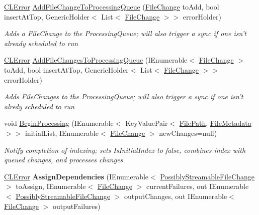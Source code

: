 \begin{DoxyCompactItemize}
\hyperlink{class_cloud_api_public_1_1_model_1_1_c_l_error}{C\-L\-Error} \hyperlink{class_cloud_api_public_1_1_file_monitor_1_1_monitor_agent_af707ac6cbc22572792f6622398843a47}{Add\-File\-Change\-To\-Processing\-Queue} (\hyperlink{class_cloud_api_public_1_1_model_1_1_file_change}{File\-Change} to\-Add, bool insert\-At\-Top, Generic\-Holder$<$ List$<$ \hyperlink{class_cloud_api_public_1_1_model_1_1_file_change}{File\-Change} $>$$>$ error\-Holder)
\begin{DoxyCompactList}\small\item\em Adds a File\-Change to the Processing\-Queue; will also trigger a sync if one isn't already scheduled to run \end{DoxyCompactList}\item 
\hyperlink{class_cloud_api_public_1_1_model_1_1_c_l_error}{C\-L\-Error} \hyperlink{class_cloud_api_public_1_1_file_monitor_1_1_monitor_agent_a6b0aae3780c7432b524a676672707ebb}{Add\-File\-Changes\-To\-Processing\-Queue} (I\-Enumerable$<$ \hyperlink{class_cloud_api_public_1_1_model_1_1_file_change}{File\-Change} $>$ to\-Add, bool insert\-At\-Top, Generic\-Holder$<$ List$<$ \hyperlink{class_cloud_api_public_1_1_model_1_1_file_change}{File\-Change} $>$$>$ error\-Holder)
\begin{DoxyCompactList}\small\item\em Adds File\-Changes to the Processing\-Queue; will also trigger a sync if one isn't alredy scheduled to run \end{DoxyCompactList}\item 
void \hyperlink{class_cloud_api_public_1_1_file_monitor_1_1_monitor_agent_af6a13b7d0c183eda555e669a90e3f122}{Begin\-Processing} (I\-Enumerable$<$ Key\-Value\-Pair$<$ \hyperlink{class_cloud_api_public_1_1_model_1_1_file_path}{File\-Path}, \hyperlink{class_cloud_api_public_1_1_model_1_1_file_metadata}{File\-Metadata} $>$$>$ initial\-List, I\-Enumerable$<$ \hyperlink{class_cloud_api_public_1_1_model_1_1_file_change}{File\-Change} $>$ new\-Changes=null)
\begin{DoxyCompactList}\small\item\em Notify completion of indexing; sets Is\-Initial\-Index to false, combines index with queued changes, and processes changes \end{DoxyCompactList}\item 
\hypertarget{class_cloud_api_public_1_1_file_monitor_1_1_monitor_agent_a19c3f9d937350ec4c8012c66705bddea}{\hyperlink{class_cloud_api_public_1_1_model_1_1_c_l_error}{C\-L\-Error} {\bfseries Assign\-Dependencies} (I\-Enumerable$<$ \hyperlink{struct_cloud_api_public_1_1_model_1_1_possibly_streamable_file_change}{Possibly\-Streamable\-File\-Change} $>$ to\-Assign, I\-Enumerable$<$ \hyperlink{class_cloud_api_public_1_1_model_1_1_file_change}{File\-Change} $>$ current\-Failures, out I\-Enumerable$<$ \hyperlink{struct_cloud_api_public_1_1_model_1_1_possibly_streamable_file_change}{Possibly\-Streamable\-File\-Change} $>$ output\-Changes, out I\-Enumerable$<$ \hyperlink{class_cloud_api_public_1_1_model_1_1_file_change}{File\-Change} $>$ output\-Failures)}\label{class_cloud_api_public_1_1_file_monitor_1_1_monitor_agent_a19c3f9d937350ec4c8012c66705bddea}


\end{DoxyCompactItemize}
